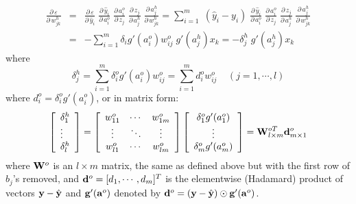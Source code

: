 \documentclass{article}
\begin{document}
\begin{itemize}
\begin{itemize}
    \begin{eqnarray}
      \frac{\partial\,\varepsilon}{\partial\, w_{jk}^h}
      & = &\frac{\partial\,\varepsilon}{\partial\, \hat{y}_i}\;
      \frac{\partial\, \hat{y}_i}{\partial\, a^o_i}\; 
      \frac{\partial\, a^o_i}{\partial\, z_j}\;
      \frac{\partial\, z_j}{\partial\, a^h_j}\;
      \frac{\partial\, a^h_j}{\partial\, w_{jk}^h}
      =\sum_{i=1}^m\;(\hat{y}_i-y_i)\;\frac{\partial\, \hat{y}_i}{\partial\, a^o_i}\;
      \frac{\partial\, a^o_i}{\partial\, z_j}\;
      \frac{\partial\, z_j}{\partial\, a^h_j}\;
      \frac{\partial\, a^h_j}{\partial\, w_{jk}^h}
      \nonumber \\
      &=& -\sum_{i=1}^m \delta_ig'(a^o_i)w_{ij}^o\;g'(a^h_j)x_k 
      =-\delta_j^{h}\;g'(a^h_j)x_k 
      \nonumber
    \end{eqnarray}
    where 
    \begin{equation}
      \delta_j^h=\sum_{i=1}^m \delta_i^o g'(a^o_i)w_{ij}^o
      =\sum_{i=1}^m d_i^o w_{ij}^o      \;\;\;\;(j=1,\cdots,l)
    \end{equation}
    where $d_i^o=\delta_i^o g'(a^o_i)$, or in matrix form:
    \begin{equation}
      \left[\begin{array}{l}\delta_1^h\\\vdots\\\delta_l^h\end{array}\right]
      =\left[\begin{array}{ccc}w_{11}^o & \cdots &w_{1m}^o\\
          \vdots & \ddots & \vdots \\ w_{l1}^o & \cdots & w_{lm}^o
          \end{array}\right]
      \left[\begin{array}{c}\delta_1^og'(a_1^o)\\\vdots\\\delta_m^og'(a_m^o)
          \end{array}\right]
      ={\bf W}^{oT}_{l\times m}{\bf d}^o_{m\times 1}
    \end{equation}
    where ${\bf W}^o$ is an $l\times m$ matrix, the same as defined 
    above but with the first row of $b_j$'s removed, and 
    ${\bf d}^o=[d_1,\cdots,d_m]^T$ is the elementwise (Hadamard)
    product of vectors ${\bf y}-\hat{\bf y}$ and ${\bf g}'({\bf a}^o)$
    denoted by ${\bf d}^o=({\bf y}-\hat{\bf y})\odot {\bf g}'({\bf a}^o)$.


\end{itemize}
\end{itemize}
\end{document}
